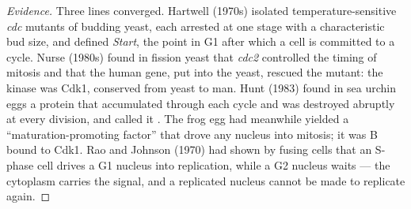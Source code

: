 \begin{proof}[Evidence]
Three lines converged. Hartwell (1970s) isolated temperature-sensitive
\emph{cdc} mutants of budding yeast, each arrested at one stage with a
characteristic bud size, and defined \emph{Start}, the point in G1 after
which a cell is committed to a cycle. Nurse (1980s) found in fission
yeast that \emph{cdc2} controlled the timing of mitosis and that the
human gene, put into the yeast, rescued the mutant: the kinase was
Cdk1, conserved from yeast to man. Hunt (1983) found in sea urchin
eggs a protein that accumulated through each cycle and was destroyed
abruptly at every division, and called it . The frog egg had
meanwhile yielded a ``maturation-promoting factor'' that drove any
nucleus into mitosis; it was  B bound to Cdk1. Rao and Johnson
(1970) had shown by fusing cells that an S-phase cell drives a G1
nucleus into replication, while a G2 nucleus waits --- the cytoplasm
carries the signal, and a replicated nucleus cannot be made to
replicate again.
\end{proof}

